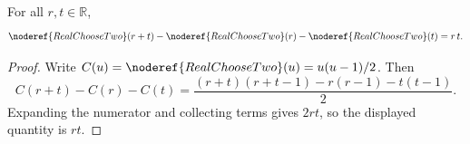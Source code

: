 \begin{helper}
For all \(r,t\in\mathbb R\),
\[
\noderef{RealChooseTwo}(r+t)
-\noderef{RealChooseTwo}(r)
-\noderef{RealChooseTwo}(t)
=r\,t.
\]
\end{helper}
\begin{proof}
Write \(C(u)=\noderef{RealChooseTwo}(u)=u(u-1)/2\).  Then
\[
C(r+t)-C(r)-C(t)
=\frac{(r+t)(r+t-1)-r(r-1)-t(t-1)}{2}.
\]
Expanding the numerator and collecting terms gives \(2rt\), so the displayed
quantity is \(rt\).
\end{proof}
